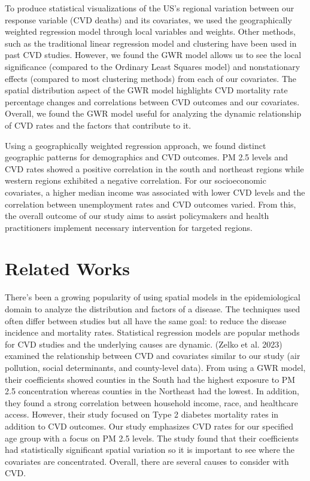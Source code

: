 \documentclass[
]{article}
\begin{document}
To produce statistical visualizations of the US's regional variation
between our response variable (CVD deaths) and its covariates, we used
the geographically weighted regression model through local variables and
weights. Other methods, such as the traditional linear regression model
and clustering have been used in past CVD studies. However, we found the
GWR model allows us to see the local significance (compared to the
Ordinary Least Squares model) and nonstationary effects (compared to
most clustering methods) from each of our covariates. The spatial
distribution aspect of the GWR model highlights CVD mortality rate
percentage changes and correlations between CVD outcomes and our
covariates. Overall, we found the GWR model useful for analyzing the
dynamic relationship of CVD rates and the factors that contribute to
it.~

Using a geographically weighted regression approach, we found distinct
geographic patterns for demographics and CVD outcomes. PM 2.5 levels and
CVD rates showed a positive correlation in the south and northeast
regions while western regions exhibited a negative correlation. For our
socioeconomic covariates, a higher median income was associated with
lower CVD levels and the correlation between unemployment rates and CVD
outcomes varied. From this, the overall outcome of our study aims to
assist policymakers and health practitioners implement necessary
intervention for targeted regions.~

\section{Related Works}\label{related-works}

There's been a growing popularity of using spatial models in the
epidemiological domain to analyze the distribution and factors of a
disease. The techniques used often differ between studies but all have
the same goal: to reduce the disease incidence and mortality rates.
Statistical regression models are popular methods for CVD studies and
the underlying causes are dynamic. (Zelko et al. 2023) examined the
relationship between CVD and covariates similar to our study (air
pollution, social determinants, and county-level data). From using a GWR
model, their coefficients showed counties in the South had the highest
exposure to PM 2.5 concentration whereas counties in the Northeast had
the lowest. In addition, they found a strong correlation between
household income, race, and healthcare access. However, their study
focused on Type 2 diabetes mortality rates in addition to CVD outcomes.
Our study emphasizes CVD rates for our specified age group with a focus
on PM 2.5 levels. The study found that their coefficients had
statistically significant spatial variation so it is important to see
where the covariates are concentrated. Overall, there are several causes
to consider with CVD.
\end{document}
